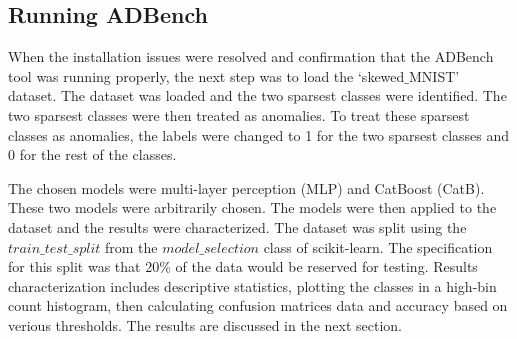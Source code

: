 \subsection{Running ADBench}
When the installation issues were resolved and confirmation that the ADBench tool was running properly, the next step was to load the `skewed$\_$MNIST'
dataset. The dataset was loaded and the two sparsest classes were identified. The two sparsest classes were then treated as anomalies.
To treat these sparsest classes as anomalies, the labels were changed to 1 for the two sparsest classes and 0 for the rest of the classes. \par

The chosen models were multi-layer perception (MLP) and CatBoost (CatB). These two models were arbitrarily chosen. The models were then applied to the dataset 
and the results were characterized. The dataset was split using the $train\_test\_split$ from the $model\_selection$ class of scikit-learn. 
The specification for this split was that 20\% of the data would be reserved for testing. 
Results characterization includes descriptive statistics, plotting the classes in a high-bin count histogram, then calculating confusion matrices data and accuracy based on verious thresholds. 
The results are discussed in the next section.\par








